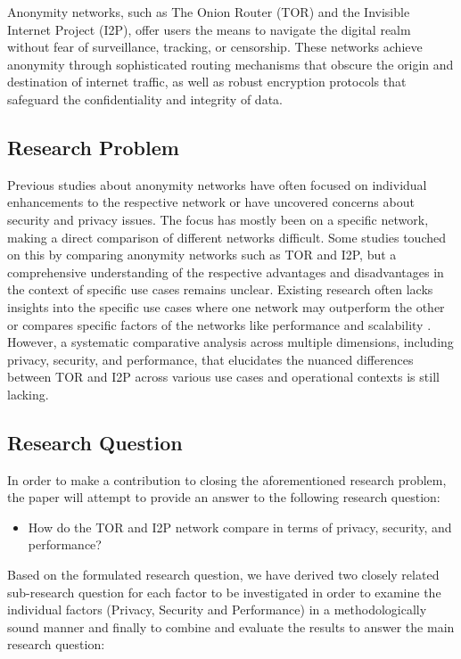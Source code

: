 \documentclass[12pt,conference]{IEEEtran}
\begin{document}
Anonymity networks, such as The Onion Router (TOR)\cite{tor} and the Invisible Internet Project (I2P)\cite{i2p}, offer users the means to navigate the digital realm without fear of surveillance, tracking, or censorship\cite{aSurveyOnTORAndI2P}. These networks achieve anonymity through sophisticated routing mechanisms that obscure the origin and destination of internet traffic, as well as robust encryption protocols that safeguard the confidentiality and integrity of data\cite{aComparativeStudyOnAnonymizingNetworks}.

\subsection{Research Problem}
Previous studies about anonymity networks have often focused on individual enhancements to the respective network\cite{aReviewOnGarlicRoutingAndArtificialIntelligenceApplicatinsInPublicNetwork} or have uncovered concerns about security and privacy issues\cite{monitoringAnAnonymityNetwork}\cite{convenientDetectionMethodForAnonymousNetworks}. The focus has mostly been on a specific network, making a direct comparison of different networks difficult. Some studies touched on this by comparing anonymity networks such as TOR and I2P, but a comprehensive understanding of the respective advantages and disadvantages in the context of specific use cases remains unclear. Existing research often lacks insights into the specific use cases where one network may outperform the other\cite{TORVsI2P}\cite{aComparativeStudyOnAnonymizingNetworks} or compares specific factors of the networks like performance and scalability \cite{I2PUsabilityVsTORUsability}\cite{aSurveyOnTORAndI2P}. However, a systematic comparative analysis across multiple dimensions, including privacy, security, and performance, that elucidates the nuanced differences between TOR and I2P across various use cases and operational contexts is still lacking. 

\subsection{Research Question}
In order to make a contribution to closing the aforementioned research problem, the paper will attempt to provide an answer to the following research question:
\begin{itemize}
	\item How do the TOR and I2P network compare in terms of privacy, security, and performance?
\end{itemize}
Based on the formulated research question, we have derived two closely related sub-research question for each factor to be investigated in order to examine the individual factors (Privacy, Security and Performance) in a methodologically sound manner and finally to combine and evaluate the results to answer the main research question:
\end{document}
